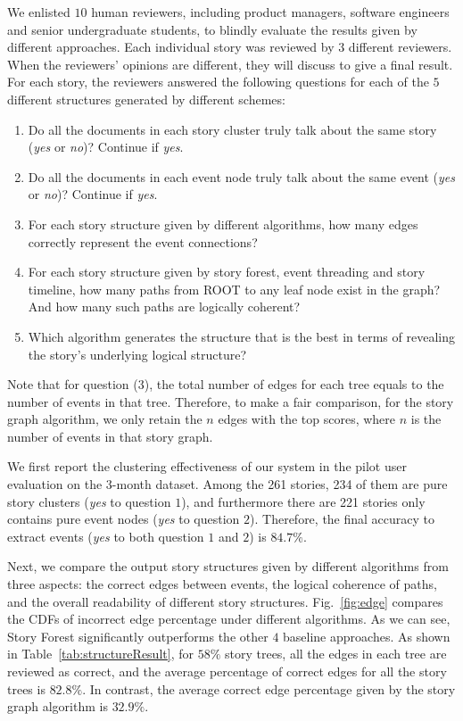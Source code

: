 We enlisted $10$ human reviewers, including product managers, software engineers and senior undergraduate students, to blindly evaluate the results given by different approaches. Each individual story was reviewed by $3$ different reviewers. When the reviewers' opinions are different, they will discuss to give a final result. For each story, the reviewers answered the following questions for each of the $5$ different structures generated by different schemes:
\begin{enumerate}
	\item Do all the documents in each story cluster truly talk about the same story (\textit{yes} or \textit{no})? Continue if \textit{yes}.
	\item Do all the documents in each event node truly talk about the same event (\textit{yes} or \textit{no})? Continue if \textit{yes}.
	\item For each story structure given by different algorithms, how many edges correctly represent the event connections?
	\item For each story structure given by story forest, event threading and story timeline, how many paths from ROOT to any leaf node exist in the graph? And how many such paths are logically coherent?
	\item Which algorithm generates the structure that is the best in terms of revealing the story's underlying logical structure?
\end{enumerate}

Note that for question (3), the total number of edges for each tree equals to the number of events in that tree. Therefore, to make a fair comparison, for the story graph algorithm, we only retain the $n$ edges with the top scores, where $n$ is the number of events in that story graph.


We first report the clustering effectiveness of our system in the pilot user evaluation on the $3$-month dataset. Among the 261 stories, 234 of them are pure story clusters (\textit{yes} to question $1$), and furthermore there are 221 stories only contains pure event nodes (\textit{yes} to question $2$). Therefore, the final accuracy to extract events (\textit{yes} to both question $1$ and $2$) is $84.7\%$.


Next, we compare the output story structures given by different algorithms from three aspects: the correct edges between events, the logical coherence of paths, and the overall readability of different story structures. Fig.~\ref{fig:edge} compares the CDFs of incorrect edge percentage under different algorithms. As we can see, Story Forest significantly  outperforms the other $4$ baseline approaches.
As shown in Table~\ref{tab:structureResult}, for $58\%$ story trees, all the edges in each tree are reviewed as correct, and the average percentage of correct edges for all the story trees is $82.8\%$. In contrast, the average correct edge percentage given by the story graph algorithm is $32.9\%$. 

